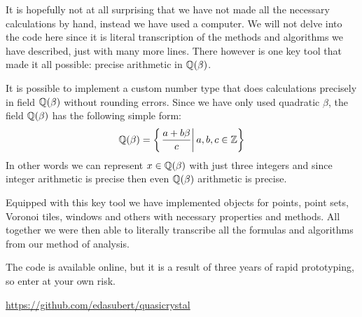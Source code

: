 \documentclass[text.tex]{subfiles}
\begin{document}
It is hopefully not at all surprising that we have not made all the necessary calculations by hand, instead we have used a computer. We will not delve into the code here since it is literal transcription of the methods and algorithms we have described, just with many more lines. There however is one key tool that made it all possible: precise arithmetic in $\mathbb{Q}(\beta)$. 

It is possible to implement a custom number type that does calculations precisely in field $\mathbb{Q}(\beta)$ without rounding errors. Since we have only used quadratic $\beta$, the field $\mathbb{Q}(\beta)$ has the following simple form: 
$$\mathbb{Q}(\beta) = \left\{\left. \frac{a+b\beta}{c} \right| a,b,c\in\mathbb{Z} \right\}$$
In other words we can represent $x\in\mathbb{Q}(\beta)$ with just three integers and since integer arithmetic is precise then even $\mathbb{Q}(\beta)$ arithmetic is precise. 

Equipped with this key tool we have implemented objects for points, point sets, Voronoi tiles, windows and others with necessary properties and methods. All together we were then able to literally transcribe all the formulas and algorithms from our method of analysis. 

The code is available online, but it is a result of three years of rapid prototyping, so enter at your own risk. 

\url{https://github.com/edasubert/quasicrystal}
\end{document}
